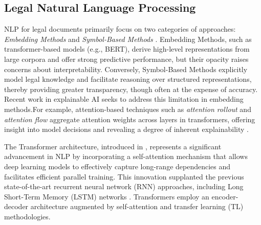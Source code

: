 \documentclass[runningheads]{llncs}
\begin{document}


\subsection{Legal Natural Language Processing}
\label{sec:legal-lang-proc}

NLP for legal documents primarily focus on two categories
of approaches: \textit{Embedding Methods} and \textit{Symbol-Based
  Methods} \cite{Zhong2020}. Embedding Methods, such as
transformer-based models (e.g., BERT), derive high-level
representations from large corpora and offer strong predictive
performance, but their opacity raises concerns about
interpretability. Conversely, Symbol-Based Methods explicitly model
legal knowledge and facilitate reasoning over structured
representations, thereby providing greater transparency, though often
at the expense of accuracy. Recent work in explainable AI seeks to
address this limitation in embedding methods.For example,
attention-based techniques such as \textit{attention rollout} and
\textit{attention flow} aggregate attention weights across layers in
transformers, offering insight into model decisions and revealing a
degree of inherent explainability \cite{Abnar2020}.

The Transformer architecture, introduced in
\cite{vaswani2017attention}, represents a significant advancement in
NLP by incorporating a self-attention
mechanism that allows deep learning models to effectively capture
long-range dependencies and facilitates efficient parallel
training. This innovation supplanted the previous state-of-the-art
recurrent neural network (RNN) approaches, including Long Short-Term
Memory (LSTM) networks \cite{tunstall2022natural}. Transformers employ
an encoder-decoder architecture augmented by self-attention and
transfer learning (TL) methodologies.
\end{document}

